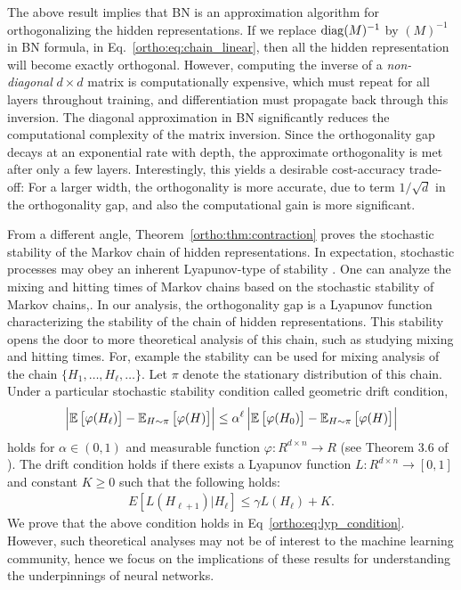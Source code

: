 The above result implies that BN is an approximation algorithm for orthogonalizing the hidden representations. If we replace $\mathrm{diag}(M)^{-1}$  by $(M)^{-1}$ in BN formula, in Eq.~\eqref{ortho:eq:chain_linear}, then all the hidden representation will become exactly orthogonal.  However, computing the inverse of a \textit{non-diagonal} $d\times d$ matrix is computationally expensive, which must repeat for all layers throughout training, and differentiation must propagate back through this inversion. The diagonal approximation in BN significantly reduces the computational complexity of the matrix inversion. Since the orthogonality gap decays at an exponential rate with depth, the approximate orthogonality is met after only a few layers. Interestingly, this yields a desirable cost-accuracy trade-off: For a larger width, the orthogonality is more accurate, due to term $1/\sqrt{d}$ in the orthogonality gap, and also the computational gain is more significant.   



From a different angle, Theorem~\ref{ortho:thm:contraction} proves the stochastic stability of the Markov chain of hidden representations. In expectation, stochastic processes may obey an inherent Lyapunov-type of stability  \citep{kushner1967stochastic,kushner2003stochastic,khasminskii2011stochastic}. One can analyze the mixing and hitting times of Markov chains based on the stochastic stability of Markov chains,\citep{kemeny1976markov,eberle2009markov}.  
In our analysis, the orthogonality gap is a Lyapunov function characterizing the stability of the chain of hidden representations. This stability opens the door to more theoretical analysis of this chain, such as studying mixing and hitting times. For, example the stability can be used for mixing analysis of the chain $\{H_1, \dots, H_\ell,\dots \}$. Let $\pi$ denote the stationary distribution of this chain. Under a particular stochastic stability condition called geometric drift condition, 
 \begin{align*}
      \left| \mathbb{E} \left[ \varphi(H_\ell) \right] - \mathbb{E}_{H \sim \pi} \left[ \varphi(H) \right] \right| \leq \alpha^{\ell} \left| \mathbb{E} \left[ \varphi(H_0) \right] - \mathbb{E}_{H \sim \pi} \left[ \varphi(H) \right] \right|
 \end{align*}
 holds for $\alpha \in (0,1)$ and measurable function $\varphi: R^{d\times n} \to R$  (see Theorem 3.6  of \citep{hairer2010convergence}). The drift condition holds if there exists a Lyapunov function $L: R^{d\times n} \to [0,1]$ and constant $K\geq 0$ such that the following holds: 
 \begin{align*}
     E \left[ L(H_{\ell+1})| H_\ell \right] \leq \gamma L(H_{\ell}) + K. 
 \end{align*}
 We prove that the above condition holds in Eq~\eqref{ortho:eq:lyp_condition}. However, such theoretical analyses may not be of interest to the machine learning community, hence we focus on the implications of these results for understanding the underpinnings of neural networks.


